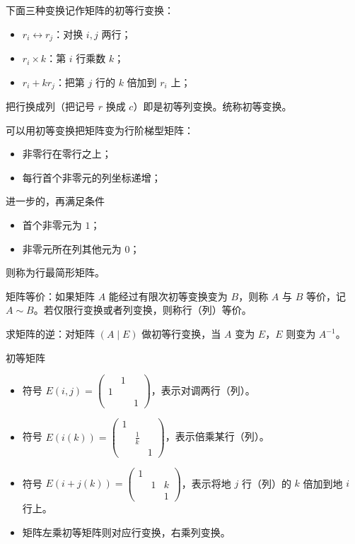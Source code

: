 下面三种变换记作矩阵的初等行变换：
\begin{itemize}
	\item $r_i \leftrightarrow r_j$：对换 $i, j$ 两行；
	\item $r_i \times k$：第 $i$ 行乘数 $k$；
	\item $r_i + kr_j$：把第 $j$ 行的 $k$ 倍加到 $r_i$ 上；
\end{itemize}
把行换成列（把记号 $r$ 换成 $c$）即是初等列变换。统称初等变换。

可以用初等变换把矩阵变为行阶梯型矩阵：
\begin{itemize}
	\item 非零行在零行之上；
	\item 每行首个非零元的列坐标递增；
\end{itemize}
进一步的，再满足条件
\begin{itemize}
	\item 首个非零元为 $1$；
	\item 非零元所在列其他元为 $0$；
\end{itemize}
则称为行最简形矩阵。

矩阵等价：如果矩阵 $A$ 能经过有限次初等变换变为 $B$，则称 $A$ 与 $B$ 等价，记 $A \sim B$。若仅限行变换或者列变换，则称行（列）等价。

求矩阵的逆：对矩阵 $(A \mid E)$ 做初等行变换，当 $A$ 变为 $E$，$E$ 则变为 $A^{-1}$。

初等矩阵
\begin{itemize}
	\item 符号 $E(i,j) = \begin{pmatrix}
			       & 1 & \\ 1 &  & \\ & & 1
		      \end{pmatrix}$，表示对调两行（列）。
	\item 符号 $E(i(k)) = \begin{pmatrix}
			      1 &  & \\  & \frac{1}{k} & \\ & & 1
		      \end{pmatrix}$，表示倍乘某行（列）。
	\item 符号 $E(i+j(k)) = \begin{pmatrix}
			      1 &  & \\  &1 & k \\ & & 1
		      \end{pmatrix}$，表示将地 $j$ 行（列）的 $k$ 倍加到地 $i$ 行上。
	\item 矩阵左乘初等矩阵则对应行变换，右乘列变换。
\end{itemize}

